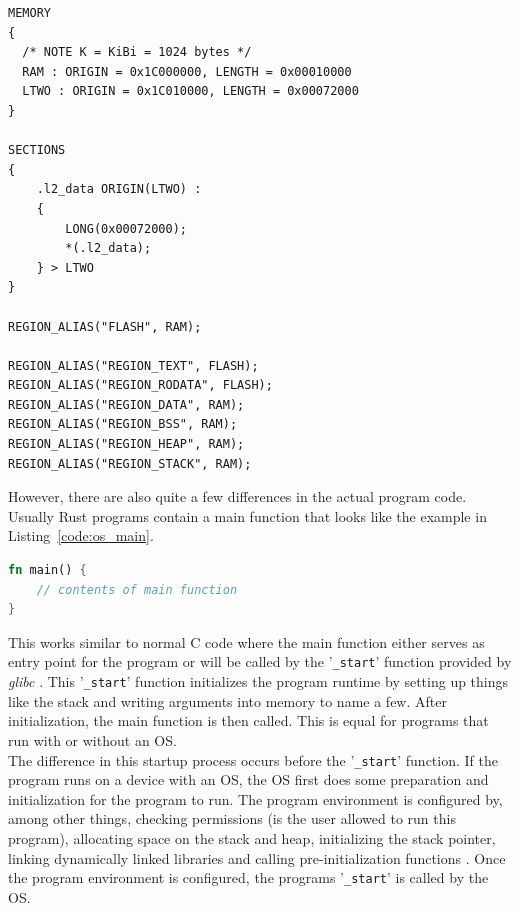 \newpage
\begin{minipage}{\textwidth}
\begin{lstlisting}[style=colorEX,caption={Example memory.x file},label={code:memory_x}]
MEMORY
{
  /* NOTE K = KiBi = 1024 bytes */
  RAM : ORIGIN = 0x1C000000, LENGTH = 0x00010000
  LTWO : ORIGIN = 0x1C010000, LENGTH = 0x00072000
}

SECTIONS
{
    .l2_data ORIGIN(LTWO) :
    {
        LONG(0x00072000);
        *(.l2_data);
    } > LTWO
}

REGION_ALIAS("FLASH", RAM);

REGION_ALIAS("REGION_TEXT", FLASH);
REGION_ALIAS("REGION_RODATA", FLASH);
REGION_ALIAS("REGION_DATA", RAM);
REGION_ALIAS("REGION_BSS", RAM);
REGION_ALIAS("REGION_HEAP", RAM);
REGION_ALIAS("REGION_STACK", RAM);

\end{lstlisting}
\end{minipage}


However, there are also quite a few differences in the actual program code.
Usually Rust programs contain a main function that looks like the example in Listing~\ref{code:os_main}.
\begin{minipage}{\textwidth}
\begin{lstlisting}[style=colorEX,language=Rust,caption={Standard main function in Rust},label={code:os_main}]
fn main() {
    // contents of main function
}
\end{lstlisting}
\end{minipage}
This works similar to normal C code where the main function either serves as entry point for the program or will be called by the '\lstinline{_start}' function provided by \emph{glibc} \cite{before_main}.
This '\lstinline{_start}' function initializes the program runtime by setting up things like the stack and writing arguments into memory to name a few.
After initialization, the main function is then called.
This is equal for programs that run with or without an OS.\\
The difference in this startup process occurs before the '\lstinline{_start}' function.
If the program runs on a device with an OS, the OS first does some preparation and initialization for the program to run.
The program environment is configured by, among other things, checking permissions (is the user allowed to run this program),
allocating space on the stack and heap, initializing the stack pointer, linking dynamically linked libraries and calling pre-initialization functions \cite{before_main}.
Once the program environment is configured, the programs '\lstinline{_start}' is called by the OS.



